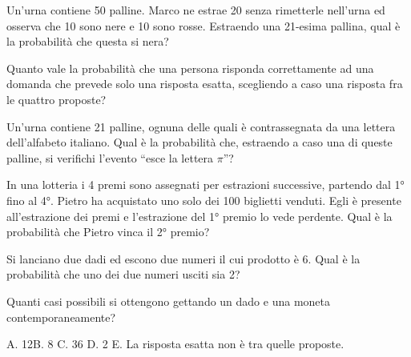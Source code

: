 \begin{esercizio} %
Un'urna contiene 50 palline. Marco ne estrae 20 senza rimetterle nell'urna ed 
osserva che 10 sono nere e 10 sono rosse. Estraendo una 21-esima pallina, qual è 
la probabilità che questa si nera?
\end{esercizio}

\begin{esercizio} %
Quanto vale la probabilità che una persona risponda correttamente ad una domanda 
che prevede solo una risposta esatta, scegliendo a caso una risposta fra le 
quattro proposte?
\end{esercizio}

\begin{esercizio} %
Un'urna contiene 21 palline, ognuna delle quali è contrassegnata da una lettera 
dell'alfabeto italiano. Qual è la probabilità che, estraendo a caso una di 
queste palline, si verifichi l'evento ``esce la lettera \( \pi \)''?
\end{esercizio}

\begin{esercizio} %
In una lotteria i 4 premi sono assegnati per estrazioni successive, partendo dal 
1° fino al 4°. Pietro ha acquistato uno solo dei 100 biglietti venduti. Egli è 
presente all'estrazione dei premi e l'estrazione del 1° premio lo vede perdente. 
Qual è la probabilità che Pietro vinca il 2° premio?
\end{esercizio}

\begin{esercizio} %
Si lanciano due dadi ed escono due numeri il cui prodotto è 6. Qual è la 
probabilità che uno dei due numeri usciti sia 2?
\end{esercizio}

\begin{esercizio} %
Quanti casi possibili si ottengono gettando un dado e una moneta 
contemporaneamente?

A. 12\quad B. 8 \quad C. 36 \quad D. 2 \quad E. La risposta esatta non è tra 
quelle proposte.
\end{esercizio}

